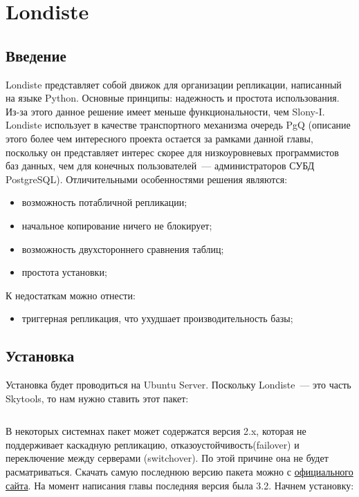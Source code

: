 \section{Londiste}
\label{sec:londiste}

\subsection{Введение}

Londiste представляет собой движок для организации репликации, написанный на языке Python. Основные принципы: надежность и простота использования. Из-за этого данное решение имеет меньше функциональности, чем Slony-I. Londiste использует в качестве транспортного механизма очередь PgQ  (описание этого более чем интересного проекта остается за рамками данной главы, поскольку он представляет интерес скорее для низкоуровневых программистов баз данных, чем для конечных пользователей~--- администраторов СУБД PostgreSQL). Отличительными особенностями решения являются:

\begin{itemize}
  \item возможность потабличной репликации;
  \item начальное копирование ничего не блокирует;
  \item возможность двухстороннего сравнения таблиц;
  \item простота установки;
\end{itemize}

К недостаткам можно отнести:

\begin{itemize}
  \item триггерная репликация, что ухудшает производительность базы;
\end{itemize}


\subsection{Установка}

Установка будет проводиться на Ubuntu Server. Поскольку Londiste~--- это часть Skytools, то нам нужно ставить этот пакет:

\begin{lstlisting}[label=lst:londiste1,caption=Установка]
% sudo aptitude install skytools
\end{lstlisting}

В некоторых системнах пакет может содержатся версия 2.x, которая не поддерживает каскадную репликацию, отказоустойчивость(failover) и переключение между серверами (switchover). По этой причине она не будет расматриваться. Скачать самую последнюю версию пакета можно с \href{http://pgfoundry.org/projects/skytools}{официального сайта}. На момент написания главы последняя версия была 3.2. Начнем установку:

